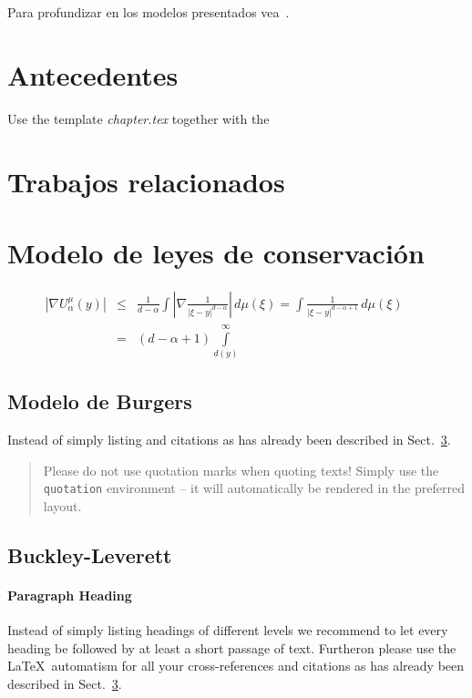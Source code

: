 Para profundizar en los modelos presentados vea~\cite{Vázquez2015}.

\section{Antecedentes}
\label{sec:1}
Use the template \emph{chapter.tex} together with the

\section{Trabajos relacionados}
\section{Modelo de leyes de conservación}
\label{sec:2}

\eject

\begin{eqnarray}
	\left|\nabla U_{\alpha}^{\mu}(y)\right| &\le&\frac1{d-\alpha}\int
	\left|\nabla\frac1{|\xi-y|^{d-\alpha}}\right|\,d\mu(\xi) =
	\int \frac1{|\xi-y|^{d-\alpha+1}} \,d\mu(\xi)\qquad  \\
	&=&(d-\alpha+1) \int\limits_{d(y)}^\infty
	\label{eq:01}
\end{eqnarray}

\enlargethispage{24pt}

\subsection{Modelo de Burgers}
\label{subsec:2}
Instead of simply listing and citations as has already been described in Sect.~\ref{sec:2}.

\begin{quotation}
	Please do not use quotation marks when quoting texts! Simply use the \verb|quotation| environment -- it will automatically be rendered in the preferred layout.
\end{quotation}

\subsection{Buckley-Leverett}

\paragraph{Paragraph Heading} %
Instead of simply listing headings of different levels we recommend to let every heading be followed by at least a short passage of text. Furtheron please use the \LaTeX\ automatism for all your cross-references and citations as has already been described in Sect.~\ref{sec:2}.

